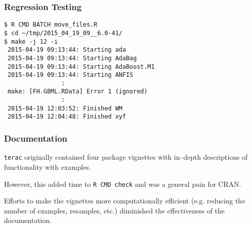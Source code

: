 \documentclass[12 pt]{beamer}\usepackage[]{graphicx}\usepackage[]{color}
\newcommand{\pkg}[1]{{\fontseries{b}\selectfont #1}}
\renewcommand{\pkg}[1]{{\color{darkgreen}\texttt{#1}}}
\begin{document}

  \begin{frame}[fragile]
\frametitle{Regression Testing}

\begin{Verbatim}[fontsize=\footnotesize]
$ R CMD BATCH move_files.R
$ cd ~/tmp/2015_04_19_09__6.0-41/
$ make -j 12 -i
 2015-04-19 09:13:44: Starting ada
 2015-04-19 09:13:44: Starting AdaBag
 2015-04-19 09:13:44: Starting AdaBoost.M1
 2015-04-19 09:13:44: Starting ANFIS
                :
 make: [FH.GBML.RData] Error 1 (ignored)
                :
 2015-04-19 12:03:52: Finished WM
 2015-04-19 12:04:48: Finished xyf
\end{Verbatim}

\end{frame}




  \begin{frame}[fragile]
\frametitle{Documentation}

\pkg{terac} originally contained four package vignettes with in--depth descriptions of functionality with examples.

\vspace{.15in}

However, this added time to \texttt{R CMD check} and was a general pain for CRAN.

\vspace{.15in}

Efforts to make the vignettes more computationally efficient (e.g. reducing the number of examples, resamples, etc.) diminished the effectiveness of the documentation.


\end{frame}

\end{document}
